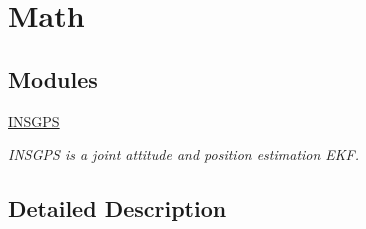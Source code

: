\hypertarget{group___math}{\section{Math}
\label{group___math}
}
\subsection*{Modules}
\begin{DoxyCompactItemize}
\item 
\hyperlink{group___i_n_s_g_p_s}{I\-N\-S\-G\-P\-S}
\begin{DoxyCompactList}\small\item\em I\-N\-S\-G\-P\-S is a joint attitude and position estimation E\-K\-F. \end{DoxyCompactList}\end{DoxyCompactItemize}


\subsection{Detailed Description}

